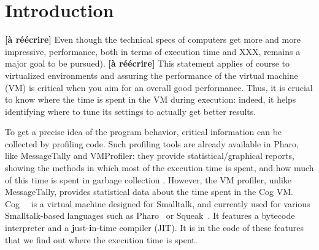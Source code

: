 \documentclass[10pt,preprint,nonatbib]{sigplanconf}
\newcommand{\ct}{\lstinline[backgroundcolor=\color{white},basicstyle=\small\ttfamily]}
\begin{document}






\section{Introduction}

%
%
%
%
%
%



\textbf{[\`a r\'e\'ecrire]} Even though the technical specs of computers get more and more impressive, performance, both in terms of execution time and XXX, remains a major goal to be pursued). \textbf{[\`a r\'e\'ecrire]}
This statement applies of course to virtualized environments and assuring the performance of the virtual machine (VM) is critical when you aim for an overall good performance. 
Thus, it is crucial to know where the time is spent in the VM during execution: indeed, it helps identifying where to tune its settings to actually get better results.

To get a precise idea of the program behavior, critical information can be collected by profiling code.
Such profiling tools are already available in Pharo, like MessageTally \cite{Berg13a} and VMProfiler: they provide statistical/graphical reports, showing the methods in which most of the execution time is spent, and how much of this time is spent in garbage collection \cite{Berg13a}. However, the VM profiler, unlike MessageTally, provides statistical data about the time spent in the Cog VM. Cog~\cite{Mira08a}~ is a virtual machine designed for Smalltalk, and currently used for various Smalltalk-based languages such as Pharo~\cite{Blac09a} or Squeak~\cite{Blac07a}. It features a bytecode interpreter and a \textbf{j}ust-\textbf{i}n-\textbf{t}ime compiler (JIT). It is in the code of these features that we find out where the execution time is spent.\\
\end{document}

